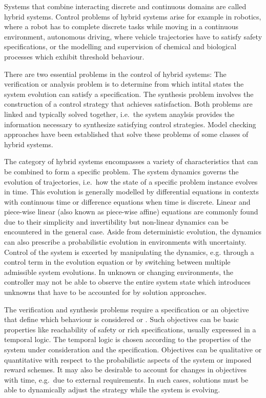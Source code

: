 Systems that combine interacting discrete and continuous domains are called hybrid systems.
Control problems of hybrid systems arise for example in robotics, where a robot has to complete discrete tasks while moving in a continuous environment, autonomous driving, where vehicle trajectories have to satisfy safety specifications, or the modelling and supervision of chemical and biological processes which exhibit threshold behaviour.

There are two essential problems in the control of hybrid systems:
The verification or analysis problem is to determine from which intital states the system evolution can satisfy a specification.
The synthesis problem involves the construction of a control strategy that achieves satisfaction.
Both problems are linked and typically solved together, i.e.\ the system anaylsis provides the information necessary to synthesize satisfying control strategies.
Model checking approaches have been established that solve these problems of some classes of hybrid systems.

The category of hybrid systems encompasses a variety of characteristics that can be combined to form a specific problem.
The system dynamics governs the evolution of trajectories, i.e.\ how the state of a specific problem instance evolves in time.
This evolution is generally modelled by differential equations in contexts with continuous time or difference equations when time is discrete.
Linear and piece-wise linear (also known as piece-wise affine) equations are commonly found due to their simplicity and invertibility but non-linear dynamics can be encountered in the general case.
Aside from deterministic evolution, the dynamics can also prescribe a probabilistic evolution in environments with uncertainty.
Control of the system is excerted by manipulating the dynamics, e.g. through a control term in the evolution equation or by switching between multiple admissible system evolutions.
In unknown or changing environments, the controller may not be able to observe the entire system state which introduces unknowns that have to be accounted for by solution approaches.

The verification and synthesis problems require a specification or an objective that define which behaviour is considered  or .
Such objectives can be basic properties like reachability of safety or rich specifications, usually expressed in a temporal logic.
The temporal logic is chosen according to the properties of the system under consideration and the specification.
Objectives can be qualitative or quantitative with respect to the probabilistic aspects of the system or imposed reward schemes.
It may also be desirable to account for changes in objectives with time, e.g.\ due to external requirements.
In such cases, solutions must be able to dynamically adjust the strategy while the system is evolving.

